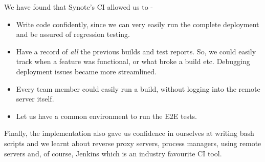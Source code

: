 We have found that Synote's CI allowed us to -

\begin{itemize}

  \item Write code confidently, since we can very easily run the complete deployment and be assured of regression testing.

  \item Have a record of \textit{all} the previous builds and test reports. So, we could easily track when a feature was functional, or what broke a build etc. Debugging deployment issues became more streamlined.

  \item Every team member could easily run a build, without logging into the remote server itself.

  \item Let us have a common environment to run the E2E tests.

\end{itemize}

Finally, the implementation also gave us confidence in ourselves at writing bash scripts and we learnt about reverse proxy servers, process managers, using remote servers and, of course, Jenkins which is an industry favourite CI tool.
